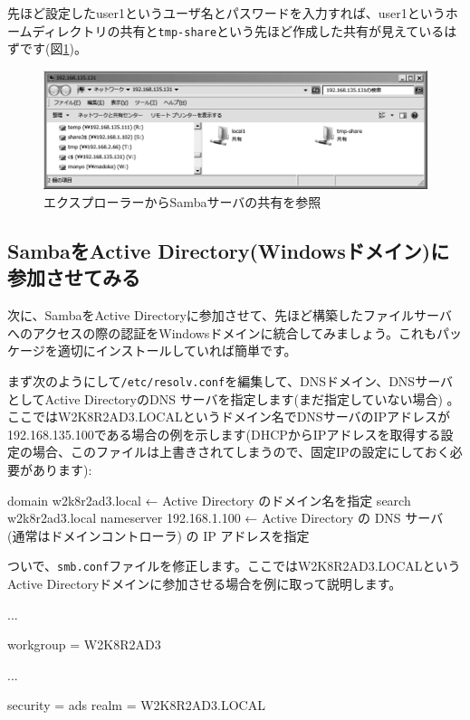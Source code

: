 \documentclass[mingoth,a4paper]{jsarticle}
\begin{document}
先ほど設定したuser1というユーザ名とパスワードを入力すれば、user1というホームディレクトリの共有と{\tt{tmp-share}}という先ほど作成した共有が見えているはずです(図\ref{fig:monyo-samba04.png})。

\begin{figure}[h]
\begin{center}
 \includegraphics[width=0.8\hsize]{image201304/samba/monyo-samba04_mono.png}
 \caption{エクスプローラーからSambaサーバの共有を参照}
 \label{fig:monyo-samba04.png}
\end{center}
\end{figure}

\subsection{SambaをActive Directory(Windowsドメイン)に参加させてみる}

次に、SambaをActive Directoryに参加させて、先ほど構築したファイルサーバへのアクセスの際の認証をWindowsドメインに統合してみましょう。これもパッケージを適切にインストールしていれば簡単です。

まず次のようにして{\tt{/etc/resolv.conf}}を編集して、DNSドメイン、DNSサーバとしてActive DirectoryのDNS サーバを指定します(まだ指定していない場合) 。ここではW2K8R2AD3.LOCALというドメイン名でDNSサーバのIPアドレスが192.168.135.100である場合の例を示します(DHCPからIPアドレスを取得する設定の場合、このファイルは上書きされてしまうので、固定IPの設定にしておく必要があります):

\begin{commandline}
domain w2k8r2ad3.local ← Active Directory のドメイン名を指定
search w2k8r2ad3.local
nameserver 192.168.1.100 ← Active Directory の DNS サーバ (通常はドメインコントローラ) の IP アドレスを指定
\end{commandline}

ついで、{\tt{smb.conf}}ファイルを修正します。ここではW2K8R2AD3.LOCALというActive Directoryドメインに参加させる場合を例に取って説明します。

\begin{commandline}
[global]
  ...

  workgroup = W2K8R2AD3

  ...

  security = ads
  realm = W2K8R2AD3.LOCAL
\end{commandline}
\end{document}
